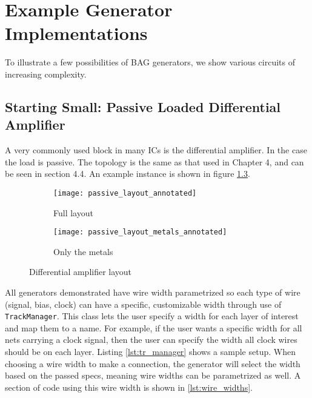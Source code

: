 \chapter{Example Generator Implementations}
To illustrate a few possibilities of BAG generators, we show various circuits of increasing complexity. 
\section{Starting Small: Passive Loaded Differential Amplifier}
A very commonly used block in many ICs is the differential amplifier. In the case the load is passive. The topology is the same as that used in Chapter 4, and can be seen in section 4.4. An example instance is shown in figure \ref{fig:passive_amp}.
\begin{figure}[h]
\centering
\begin{subfigure}{.8\linewidth}
  \centering
  \texttt{[image: passive\_layout\_annotated]}
  \caption{Full layout}
  \label{fig:sfig1}
\end{subfigure}
\begin{subfigure}{.8\linewidth}
  \centering
\texttt{[image: passive\_layout\_metals\_annotated]}
  \caption{Only the metals}
  \label{fig:sfig2}
\end{subfigure}
\caption{Differential amplifier layout}
\label{fig:passive_amp}
\end{figure}
All generators demonstrated have wire width parametrized so each type of wire (signal, bias, clock) can have a specific, customizable width through use of \texttt{TrackManager}. This class lets the user specify a width for each layer of interest and map them to a name. For example, if the user wants a specific width for all nets carrying a clock signal, then the user can specify the width all clock wires should be on each layer. Listing \ref{lst:tr_manager} shows a sample setup. When choosing a wire width to make a connection, the generator will select the width based on the passed specs, meaning wire widths can be parametrized as well. A section of code using this wire width is shown in \ref{lst:wire_widths}. 


